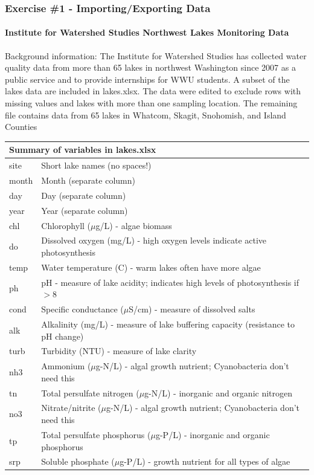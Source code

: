 \documentclass[10pt]{beamer}
\begin{document}
\begin{frame}
\frametitle{Exercise \#1 - Importing/Exporting Data}
\framesubtitle{Institute for Watershed Studies Northwest Lakes Monitoring Data}

{\scriptsize Background information: The Institute for Watershed
  Studies has collected water quality data from more than 65 lakes in
  northwest Washington since 2007 as a public service and to provide
  internships for WWU students.  A subset of the lakes data are
  included in lakes.xlsx.  The data were edited to exclude rows with
  missing values and lakes with more than one sampling location. The
  remaining file contains data from 65 lakes in Whatcom, Skagit,
  Snohomish, and Island Counties\\}

\vspace{2ex}
{\scriptsize
\begin{tabular}{ll} 
\multicolumn{2}{l}{Summary of variables in lakes.xlsx}\\ \hline
site   & Short lake names (no spaces!)\\
month  & Month (separate column)\\
day    & Day (separate column)\\
year   & Year (separate column)\\
chl    & Chlorophyll ($\mu$g/L) - algae biomass\\
do     & Dissolved oxygen (mg/L) - high oxygen levels indicate active photosynthesis\\
temp   & Water temperature (C) - warm lakes often have more algae\\
ph     & pH - measure of lake acidity; indicates high levels of photosynthesis if $>$8\\
cond   & Specific conductance ($\mu$S/cm) - measure of dissolved salts\\
alk    & Alkalinity (mg/L) - measure of lake buffering capacity (resistance to pH change)\\
turb   & Turbidity (NTU) - measure of lake clarity\\
nh3    & Ammonium ($\mu$g-N/L) - algal growth nutrient; Cyanobacteria don't need this\\
tn     & Total persulfate nitrogen ($\mu$g-N/L) - inorganic and organic nitrogen\\
no3    & Nitrate/nitrite ($\mu$g-N/L) - algal growth nutrient; Cyanobacteria don't need this\\
tp     & Total persulfate phosphorus ($\mu$g-P/L) - inorganic and organic phosphorus\\
srp    & Soluble phosphate ($\mu$g-P/L) - growth nutrient for all types of algae\\ \hline
\end{tabular}
}
\end{frame}
\end{document}
